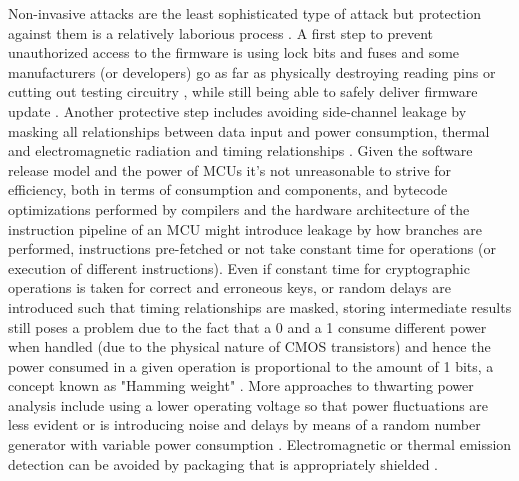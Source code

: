Non-invasive attacks are the least sophisticated type of attack but protection against them is a relatively laborious process \citep{anderson:cautionary_note}. A first step to prevent unauthorized access to the firmware is using lock bits and fuses \citep{atmega_manual} \citep{tech:avrfreaks} and some manufacturers (or developers) go as far as physically destroying reading pins or cutting out testing circuitry \citep{sergei:thesis}, while still being able to safely deliver firmware update \citep{tech:aes_bls}. Another protective step includes avoiding side-channel leakage by masking all relationships between data input and power consumption, thermal and electromagnetic radiation and timing relationships \citep{kocher:DPA} \cite{sergei:thesis}. Given the software release model and the power of MCUs it's not unreasonable to strive for efficiency, both in terms of consumption and components, and bytecode optimizations performed by compilers and the hardware architecture of the instruction pipeline of an MCU might introduce leakage \citep{kocher:DPA} \citep{sergei:thesis} by how branches are performed, instructions pre-fetched or not take constant time for operations (or execution of different instructions). Even if constant time for cryptographic operations is taken for correct and erroneous keys, or random delays are introduced such that timing relationships are masked, storing intermediate results still poses a problem due to the fact that a 0 and a 1 consume different power when handled (due to the physical nature of CMOS transistors) and hence the power consumed in a given operation is proportional to the amount of 1 bits, a concept known as "Hamming weight" \citep{website:riscure} \citep{kocher:DPA} \citep{book:power_analysis}. More approaches to thwarting power analysis include using a lower operating voltage so that power fluctuations are less evident or is introducing noise and delays by means of a random number generator with variable power consumption \citep{kocher:DPA} \citep{hwre} \citep{avr_mega} \citep{book:power_analysis}. Electromagnetic or thermal emission detection can be avoided by packaging that is appropriately shielded \citep{website:ibm_secure} \citep{kocher:DPA}. 

